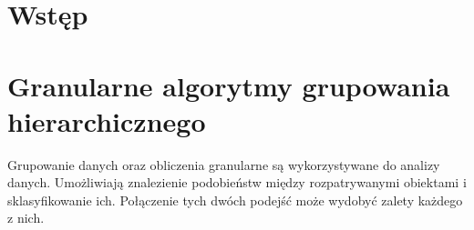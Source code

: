 \documentclass[a4paper,twoside,12pt]{book}
\newcounter{stronyPozaNumeracja}
\begin{document}
\tableofcontents

\setcounter{stronyPozaNumeracja}{\value{page}}
\mainmatter
\pagestyle{empty}

\cleardoublepage

\pagestyle{NumeryStronNazwyRozdzialow}


\chapter{Wstęp}




\chapter{Granularne algorytmy grupowania hierarchicznego}  %
% 

 

Grupowanie danych oraz obliczenia granularne są wykorzystywane do analizy danych. Umożliwiają znalezienie podobieństw między rozpatrywanymi obiektami i sklasyfikowanie ich. Połączenie tych dwóch podejść może wydobyć zalety każdego z nich. 

%
\end{document}
